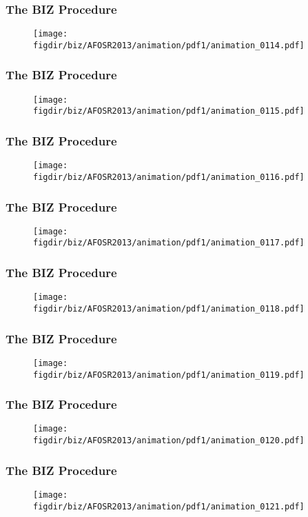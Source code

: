 \documentclass[13pt]{beamer}
\newcommand{\figdir}{../../fig}
\begin{document}
{\begin{frame}\frametitle{The BIZ Procedure}\begin{figure}\texttt{[image: \\figdir/biz/AFOSR2013/animation/pdf1/animation\_0114.pdf]}\end{figure}\end{frame}
\begin{frame}\frametitle{The BIZ Procedure}\begin{figure}\texttt{[image: \\figdir/biz/AFOSR2013/animation/pdf1/animation\_0115.pdf]}\end{figure}\end{frame}
\begin{frame}\frametitle{The BIZ Procedure}\begin{figure}\texttt{[image: \\figdir/biz/AFOSR2013/animation/pdf1/animation\_0116.pdf]}\end{figure}\end{frame}
\begin{frame}\frametitle{The BIZ Procedure}\begin{figure}\texttt{[image: \\figdir/biz/AFOSR2013/animation/pdf1/animation\_0117.pdf]}\end{figure}\end{frame}
\begin{frame}\frametitle{The BIZ Procedure}\begin{figure}\texttt{[image: \\figdir/biz/AFOSR2013/animation/pdf1/animation\_0118.pdf]}\end{figure}\end{frame}
\begin{frame}\frametitle{The BIZ Procedure}\begin{figure}\texttt{[image: \\figdir/biz/AFOSR2013/animation/pdf1/animation\_0119.pdf]}\end{figure}\end{frame}
\begin{frame}\frametitle{The BIZ Procedure}\begin{figure}\texttt{[image: \\figdir/biz/AFOSR2013/animation/pdf1/animation\_0120.pdf]}\end{figure}\end{frame}
\begin{frame}\frametitle{The BIZ Procedure}\begin{figure}\texttt{[image: \\figdir/biz/AFOSR2013/animation/pdf1/animation\_0121.pdf]}\end{figure}\end{frame}
}
\end{document}
